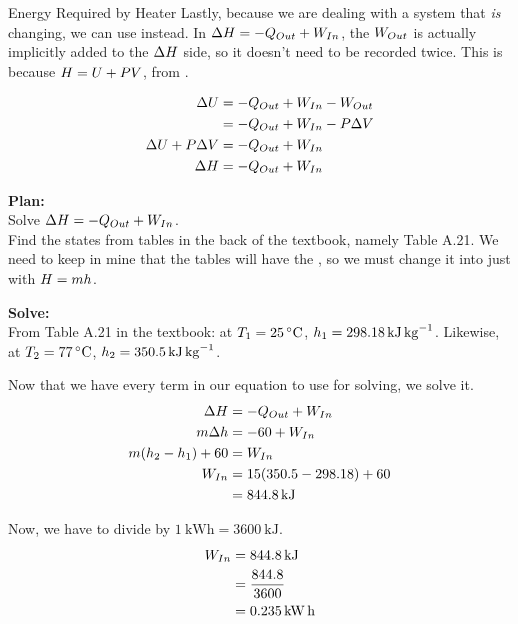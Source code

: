 \begin{example}{Energy Required by Heater}
  Lastly, because we are dealing with a system that \emph{is} changing, we can use  instead.
  In $\Delta H = -Q_{Out} + W_{In}$, the $W_{Out}$ is actually implicitly added to the $\Delta H$ side, so it doesn't need to be recorded twice.
  This is because $H = U + P V$, from .

  \begin{align*}
    \Delta U &= -Q_{Out} + W_{In} - W_{Out} \\
                             &= -Q_{Out} + W_{In} - P \Delta V \\
    \Delta U + P \Delta V &= -Q_{Out} + W_{In} \\
    \Delta H &= -Q_{Out} + W_{In} \\
  \end{align*}

  \textbf{Plan:} \\
  Solve $\Delta H = -Q_{Out} + W_{In}$. \\
  Find the states from tables in the back of the textbook, namely Table A.21.
  We need to keep in mine that the tables will have the , so we must change it into just  with $H = m h$.

  \textbf{Solve:} \\
  From Table A.21 in the textbook: at $\Temp_{1} = \SI{25}{\degreeCelsius}$, $h_{1} = \SI{298.18}{\kilo\joule\per\kilo\gram}$.
  Likewise, at $\Temp_{2} = \SI{77}{\degreeCelsius}$, $h_{2} = \SI{350.5}{\kilo\joule\per\kilo\gram}$.

  Now that we have every term in our equation to use for solving, we solve it.
  \begin{align*}
    \Delta H &= -Q_{Out} + W_{In} \\
    m \Delta h &= -60 + W_{In} \\
    m (h_{2} - h_{1}) + 60 &= W_{In} \\
    W_{In} &= 15 (350.5 - 298.18) + 60 \\
                       &= \SI{844.8}{\kilo\joule}
  \end{align*}

  Now, we have to divide by $\SI{1}{\kilo\watt\hour} = \SI{3600}{\kilo\joule}$.
  \begin{align*}
    W_{In} &= \SI{844.8}{\kilo\joule} \\
               &= \frac{844.8}{3600} \\
               &= \SI{0.235}{\kilo\watt\hour}
  \end{align*}


\end{example}
